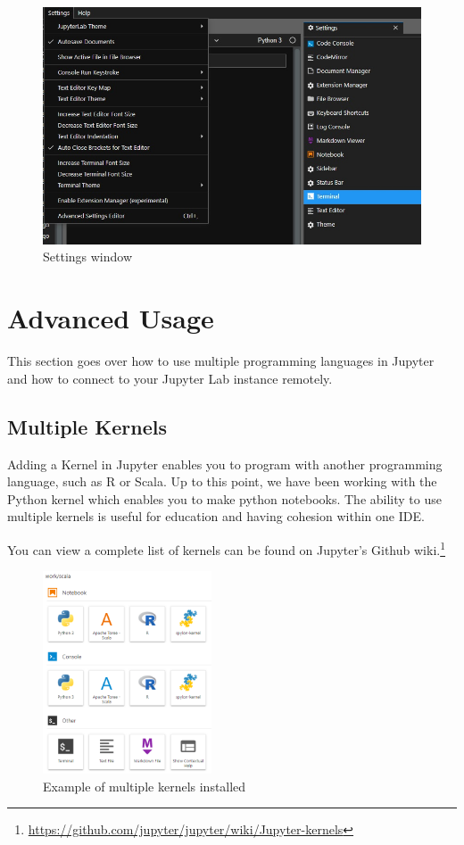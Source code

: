 \documentclass[pdftex,12pt]{artikel3}
\begin{document}
\begin{figure}[h!]
    \centering
    \includegraphics[width=15cm]{settings.jpg}
    \caption{Settings window}
    \label{fig:configuration}
\end{figure}

\section{Advanced Usage}

This section goes over how to use multiple programming languages in Jupyter and how to connect to your Jupyter Lab instance remotely.

\subsection{Multiple Kernels}

Adding a Kernel in Jupyter enables you to program with another programming language, such as R or Scala.
Up to this point, we have been working with the Python kernel which enables you to make python notebooks. The ability to use multiple kernels is useful for education and having cohesion within one IDE.

You can view a complete list of kernels can be found on Jupyter's Github wiki.\footnote{\url{https://github.com/jupyter/jupyter/wiki/Jupyter-kernels}}

\begin{figure}[h!]
    \centering
    \includegraphics[width=50mm]{exampleKernels.PNG}
    \caption{Example of multiple kernels installed}
    \label{fig:multKernels}
\end{figure}
\end{document}
